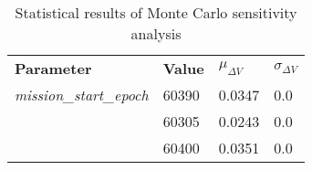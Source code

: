 
                    \begin{table}[]
                    \centering
                    \begin{tabular}{l l l l}
                    \rowcolor[HTML]{EFEFEF} \textbf{Parameter} & \textbf{Value} & \textbf{$\mu_{\Delta V}$} & \textbf{$\sigma_{\Delta V}$} \\
                    \textit{mission\_start\_epoch} & 60390 & 0.0347 & 0.0 \\
 & 60305 & 0.0243 & 0.0 \\
 & 60400 & 0.0351 & 0.0 \\

                    \end{tabular}
                    \caption{Statistical results of Monte Carlo sensitivity analysis}
                    \label{tab:SensitivityAnalysis}
                    \end{table}
                    
